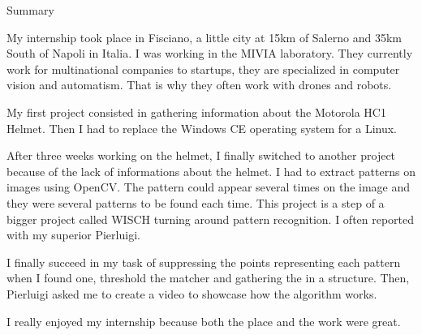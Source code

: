 \documentclass[english,a4paper,11pt]{report}
\begin{document}
	\listoffigures
		
	\newpage

\Large{Summary}
\vspace{5pt}
\normalsize
	\par My internship took place in Fisciano, a little city at 15km of Salerno and 35km South of Napoli in Italia. I was working in the MIVIA laboratory. They currently work for multinational companies to startups, they are specialized in computer vision and automatism. That is why they often work with drones and robots.
	\par My first project consisted in gathering information about the Motorola HC1 Helmet. Then I had to replace the Windows CE operating system for a Linux.
	\par After three weeks working on the helmet, I finally switched to another project because of the lack of informations about the helmet. I had to extract patterns on images using OpenCV. The pattern could appear several times on the image and they were several patterns to be found each time. This project is a step of a bigger project called WISCH turning around pattern recognition. I often reported with my superior Pierluigi.
	\par I finally succeed in my task of suppressing the points representing each pattern when I found one, threshold the matcher and gathering the in a structure. Then, Pierluigi asked me to create a video to showcase how the algorithm works.
	\par I really enjoyed my internship because both the place and the work were great.
	
\end{document}
